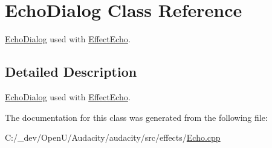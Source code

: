 \hypertarget{class_echo_dialog}{}\section{Echo\+Dialog Class Reference}
\label{class_echo_dialog}


\hyperlink{class_echo_dialog}{Echo\+Dialog} used with \hyperlink{class_effect_echo}{Effect\+Echo}.  




\subsection{Detailed Description}
\hyperlink{class_echo_dialog}{Echo\+Dialog} used with \hyperlink{class_effect_echo}{Effect\+Echo}. 

The documentation for this class was generated from the following file\+:\begin{DoxyCompactItemize}
\item 
C\+:/\+\_\+dev/\+Open\+U/\+Audacity/audacity/src/effects/\hyperlink{_echo_8cpp}{Echo.\+cpp}\end{DoxyCompactItemize}
